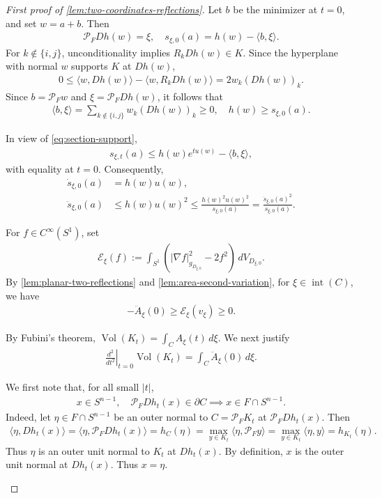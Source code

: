 \documentclass[12pt]{amsart}
\newcommand{\Sn}{S^{n-1}}
\newcommand{\ip}[2]{\langle #1,#2\rangle}
\newcommand{\eq}[1]{\begin{equation}\begin{alignedat}{2}#1\end{alignedat}\end{equation}}
\theoremstyle{plain}
\theoremstyle{definition}
\theoremstyle{remark}
\numberwithin{equation}{section}
\begin{document}
\begin{proof}[First proof of \autoref{lem:two-coordinates-reflections}]
Let $b$ be the minimizer at $t=0$, and set $w=a+b$. Then
\eq{
 \mathcal{P}_{F}Dh(w)=\xi,\quad
 s_{\xi,0}(a)=h(w)-\ip{b}{\xi}.
}
For $k\notin\{i,j\}$, unconditionality implies $R_kDh(w)\in K$. Since the hyperplane with normal $w$ supports $K$ at $Dh(w)$,
\eq{
 0\leq\ip{w}{Dh(w)}-\ip{w}{R_kDh(w)}=2w_k(Dh(w))_k.
}
Since $b=\mathcal{P}_{F}w$ and $\xi=\mathcal{P}_{F}Dh(w)$, it follows that
\eq{
 \ip{b}{\xi}=\sum_{k\notin\{i,j\}}w_k(Dh(w))_k\geq 0, \quad 
 h(w)\geq s_{\xi,0}(a).
}

In view of \eqref{eq:section-support},
\eq{\label{eq:for-second-proof}
 s_{\xi,t}(a)\leq h(w)e^{tu(w)}-\ip{b}{\xi},
}
with equality at $t=0$. Consequently,
\eq{\label{eq:section-log-concavity}
 \dot{s}_{\xi,0}(a)&=h(w)u(w),\\
 \ddot{s}_{\xi,0}(a)&\leq h(w)u(w)^2
 \leq\frac{h(w)^2u(w)^2}{s_{\xi,0}(a)}
 =\frac{\dot{s}_{\xi,0}(a)^2}{s_{\xi,0}(a)}.
}

For $f\in C^{\infty}(S^1)$, set
\eq{
 \mathcal{E}_{\xi}(f):=
 \int_{S^1}\left(|\nabla f|_{g_{D_{\xi,0}}}^2-2f^2\right)
 \,dV_{D_{\xi,0}}.
}
By \autoref{lem:planar-two-reflections} and \autoref{lem:area-second-variation}, for $\xi\in\operatorname{int}(C)$, we have
\eq{\label{eq:sectional-energy-pointwise}
 -\ddot{A}_{\xi}(0)\geq\mathcal{E}_{\xi}(v_{\xi})\geq 0.
}


By Fubini's theorem, $ \operatorname{Vol}(K_t)=\int_C A_{\xi}(t)\,d\xi$. We next justify
\eq{\label{eq:volume-concavity}
 \left.\frac{d^2}{dt^2}\right|_{t=0}\operatorname{Vol}(K_t)
 =\int_C \ddot{A}_{\xi}(0)\,d\xi.
}


We first note that, for all small $|t|$,
\eq{
x\in \Sn,\quad \mathcal{P}_{F}Dh_t(x)\in\partial C  \implies x\in F\cap\Sn.
}
Indeed, let $\eta\in F\cap\Sn$ be an outer normal to $C=\mathcal{P}_{F}K_t$ at $\mathcal{P}_{F}Dh_t(x)$. Then
\eq{
 \ip{\eta}{Dh_t(x)}
 =\ip{\eta}{\mathcal{P}_{F}Dh_t(x)}
 =h_C(\eta)=\max_{y\in K_t}\langle\eta,\mathcal{P}_Fy\rangle=\max_{y\in K_t}\langle\eta,y\rangle=h_{K_t}(\eta).
}
Thus $\eta$ is an outer unit normal to $K_t$ at $Dh_t(x)$. By definition, $x$ is the outer unit normal at $Dh_t(x)$. Thus $x=\eta$.

\begin{figure}[H]
\end{figure}
\end{proof}
\end{document}

